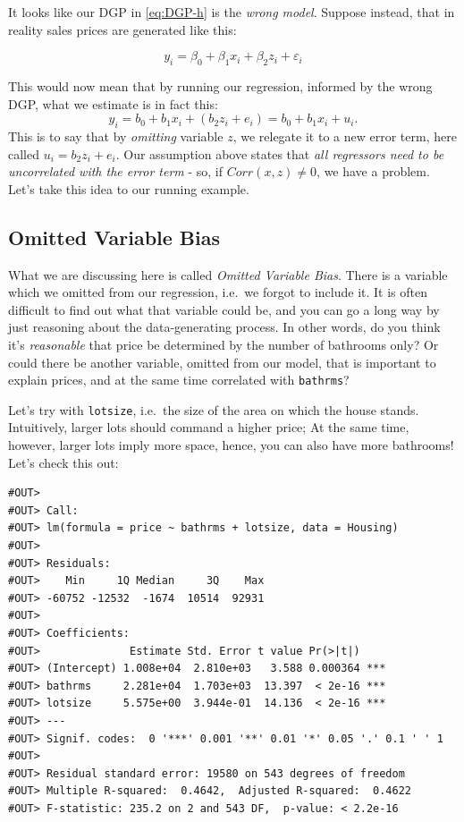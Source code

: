 \documentclass[]{book}
\begin{document}
It looks like our DGP in \eqref{eq:DGP-h} is the \emph{wrong model}. Suppose instead, that in reality sales prices are generated like this:

\begin{equation}
y_i = \beta_0 + \beta_1 x_i + \beta_2 z_i + \varepsilon_i \label{eq:DGP-h2}
\end{equation}

This would now mean that by running our regression, informed by the wrong DGP, what we estimate is in fact this:
\[
y_i = b_0 + b_1 x_i + (b_2 z_i + e_i)  = b_0 + b_1 x_i + u_i.
\]
This is to say that by \emph{omitting} variable \(z\), we relegate it to a new error term, here called \(u_i = b_2 z_i + e_i\). Our assumption above states that \emph{all regressors need to be uncorrelated with the error term} - so, if \(Corr(x,z)\neq 0\), we have a problem. Let's take this idea to our running example.

\hypertarget{omitted-variable-bias}{%
\subsection{Omitted Variable Bias}\label{omitted-variable-bias}}

What we are discussing here is called \emph{Omitted Variable Bias}. There is a variable which we omitted from our regression, i.e.~we forgot to include it. It is often difficult to find out what that variable could be, and you can go a long way by just reasoning about the data-generating process. In other words, do you think it's \emph{reasonable} that price be determined by the number of bathrooms only? Or could there be another variable, omitted from our model, that is important to explain prices, and at the same time correlated with \texttt{bathrms}?

Let's try with \texttt{lotsize}, i.e.~the size of the area on which the house stands. Intuitively, larger lots should command a higher price; At the same time, however, larger lots imply more space, hence, you can also have more bathrooms! Let's check this out:

\begin{verbatim}
#OUT> 
#OUT> Call:
#OUT> lm(formula = price ~ bathrms + lotsize, data = Housing)
#OUT> 
#OUT> Residuals:
#OUT>    Min     1Q Median     3Q    Max 
#OUT> -60752 -12532  -1674  10514  92931 
#OUT> 
#OUT> Coefficients:
#OUT>              Estimate Std. Error t value Pr(>|t|)    
#OUT> (Intercept) 1.008e+04  2.810e+03   3.588 0.000364 ***
#OUT> bathrms     2.281e+04  1.703e+03  13.397  < 2e-16 ***
#OUT> lotsize     5.575e+00  3.944e-01  14.136  < 2e-16 ***
#OUT> ---
#OUT> Signif. codes:  0 '***' 0.001 '**' 0.01 '*' 0.05 '.' 0.1 ' ' 1
#OUT> 
#OUT> Residual standard error: 19580 on 543 degrees of freedom
#OUT> Multiple R-squared:  0.4642,  Adjusted R-squared:  0.4622 
#OUT> F-statistic: 235.2 on 2 and 543 DF,  p-value: < 2.2e-16
\end{verbatim}
\end{document}
